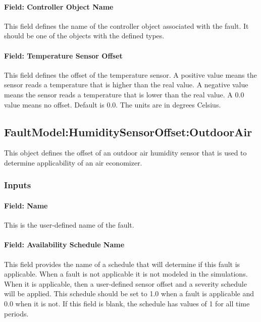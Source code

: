 \paragraph{Field: Controller Object Name}\label{field-controller-object-name}

This field defines the name of the controller object associated with the fault. It should be one of the objects with the defined types.

\paragraph{Field: Temperature Sensor Offset}\label{field-temperature-sensor-offset}

This field defines the offset of the temperature sensor. A positive value means the sensor reads a temperature that is higher than the real value. A negative value means the sensor reads a temperature that is lower than the real value. A 0.0 value means no offset. Default is 0.0. The units are in degrees Celsius.

\subsection{FaultModel:HumiditySensorOffset:OutdoorAir}\label{faultmodelhumiditysensoroffsetoutdoorair}

This object defines the offset of an outdoor air humidity sensor that is used to determine applicability of an air economizer.

\subsubsection{Inputs}\label{inputs-1-026}

\paragraph{Field: Name}\label{field-name-1-025}

This is the user-defined name of the fault.

\paragraph{Field: Availability Schedule Name}\label{field-availability-schedule-name-1-009}

This field provides the name of a schedule that will determine if this fault is applicable. When a fault is not applicable it is not modeled in the simulations. When it is applicable, then a user-defined sensor offset and a severity schedule will be applied. This schedule should be set to 1.0 when a fault is applicable and 0.0 when it is not. If this field is blank, the schedule has values of 1 for all time periods.

